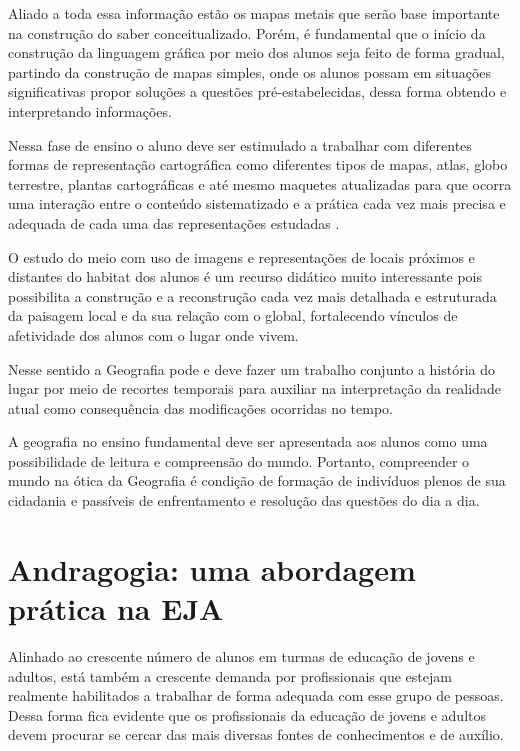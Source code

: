 \begin{refsection}
    Aliado a toda essa informação estão os mapas metais que serão base importante na construção do saber conceitualizado. Porém, é fundamental que o início da construção da linguagem gráfica por meio dos alunos seja feito de forma gradual, partindo da construção de mapas simples, onde os alunos possam em situações significativas propor soluções a questões pré-estabelecidas, dessa forma obtendo e interpretando informações.  

    Nessa fase de ensino o aluno deve ser estimulado a trabalhar com diferentes formas de representação cartográfica como diferentes tipos de mapas, atlas, globo terrestre, plantas cartográficas e até mesmo maquetes atualizadas para que ocorra uma interação entre o conteúdo sistematizado e a prática cada vez mais precisa e adequada de cada uma das representações estudadas \cite{ALMEIDA2007Cartografia}.  

    O estudo do meio com uso de imagens e representações de locais próximos e distantes do habitat dos alunos é um recurso didático muito interessante pois possibilita a construção e a reconstrução cada vez mais detalhada e estruturada da paisagem local e da sua relação com o global, fortalecendo vínculos de afetividade dos alunos com o lugar onde vivem.  

    Nesse sentido a Geografia pode e deve fazer um trabalho conjunto a história do lugar por meio de recortes temporais para auxiliar na interpretação da realidade atual como consequência das modificações ocorridas no tempo. 

    A geografia no ensino fundamental deve ser apresentada aos alunos como uma possibilidade de leitura e compreensão do mundo. Portanto, compreender o mundo na ótica da Geografia é condição de formação de indivíduos plenos de sua cidadania e passíveis de enfrentamento e resolução das questões do dia a dia.  


    \section{Andragogia: uma abordagem prática na EJA}

    Alinhado ao crescente número de alunos em turmas de educação de jovens e adultos, está também a crescente demanda por profissionais que estejam realmente habilitados a trabalhar de forma adequada com esse grupo de pessoas. Dessa forma fica evidente que os profissionais da educação de jovens e adultos devem procurar se cercar das mais diversas fontes de conhecimentos e de auxílio. 


\end{refsection}
